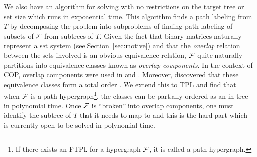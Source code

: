 We also have an algorithm for solving {\CFTPL} with no restrictions on
the target tree or set size which runs in exponential time.  This
algorithm finds a path labeling from $T$ by decomposing the problem
into subproblems of finding path labeling of subsets of ${\cal F}$ from
subtrees of $T$. Given the fact that binary matrices naturally
represent a set system (see Section~\ref{sec:motive}) and that the
{\em overlap}
relation between the sets involved is an obvious equivalence relation,
${\cal F}$ quite naturally partitions into equivalence classes known as
{\em overlap components}. In the context of COP, overlap components were used in
\cite{wlh02} and \cite{kklv10}. Moreover, \cite{nsnrs09} discovered
that these equivalence classes form a total order . We extend this to TPL
and find that when ${\cal F}$ is a path hypergraph\footnote{If there exists
  an FTPL for a hypergraph ${\cal F}$, it is called a path hypergraph.},
the classes can be partially ordered as an in-tree in polynomial
time. Once ${\cal F}$ is ``broken'' into overlap components, one must
identify the subtree of $T$ that it needs to map to and this is the
hard part which is currently open to be solved in polynomial time.



